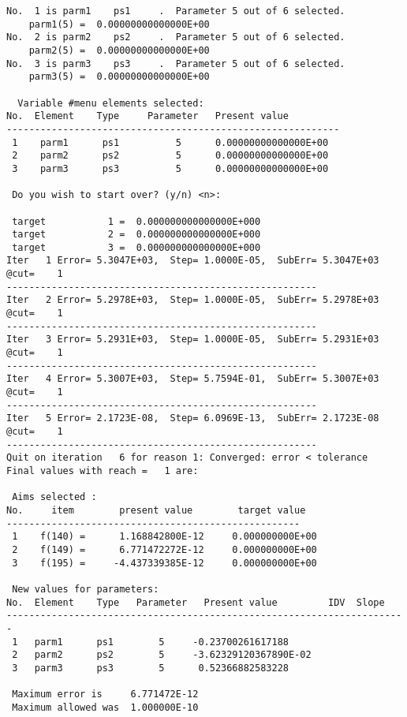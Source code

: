 \begin{footnotesize}
\begin{verbatim}
No.  1 is parm1    ps1     .  Parameter 5 out of 6 selected.
    parm1(5) =  0.00000000000000E+00
No.  2 is parm2    ps2     .  Parameter 5 out of 6 selected.
    parm2(5) =  0.00000000000000E+00
No.  3 is parm3    ps3     .  Parameter 5 out of 6 selected.
    parm3(5) =  0.00000000000000E+00

  Variable #menu elements selected:
No.  Element    Type     Parameter   Present value
-----------------------------------------------------------
 1    parm1      ps1          5      0.00000000000000E+00
 2    parm2      ps2          5      0.00000000000000E+00
 3    parm3      ps3          5      0.00000000000000E+00

 Do you wish to start over? (y/n) <n>:

 target           1 =  0.000000000000000E+000
 target           2 =  0.000000000000000E+000
 target           3 =  0.000000000000000E+000
Iter   1 Error= 5.3047E+03,  Step= 1.0000E-05,  SubErr= 5.3047E+03 @cut=    1
-------------------------------------------------------
Iter   2 Error= 5.2978E+03,  Step= 1.0000E-05,  SubErr= 5.2978E+03 @cut=    1
-------------------------------------------------------
Iter   3 Error= 5.2931E+03,  Step= 1.0000E-05,  SubErr= 5.2931E+03 @cut=    1
-------------------------------------------------------
Iter   4 Error= 5.3007E+03,  Step= 5.7594E-01,  SubErr= 5.3007E+03 @cut=    1
-------------------------------------------------------
Iter   5 Error= 2.1723E-08,  Step= 6.0969E-13,  SubErr= 2.1723E-08 @cut=    1
-------------------------------------------------------
Quit on iteration   6 for reason 1: Converged: error < tolerance
Final values with reach =   1 are:

 Aims selected :
No.     item        present value        target value
----------------------------------------------------
 1    f(140) =      1.168842800E-12     0.000000000E+00
 2    f(149) =      6.771472272E-12     0.000000000E+00
 3    f(195) =     -4.437339385E-12     0.000000000E+00

 New values for parameters:
No.  Element    Type   Parameter   Present value         IDV  Slope
-----------------------------------------------------------------------
 1   parm1      ps1        5     -0.23700261617188
 2   parm2      ps2        5     -3.62329120367890E-02
 3   parm3      ps3        5      0.52366882583228

 Maximum error is     6.771472E-12
 Maximum allowed was  1.000000E-10


\end{verbatim}
\end{footnotesize}
